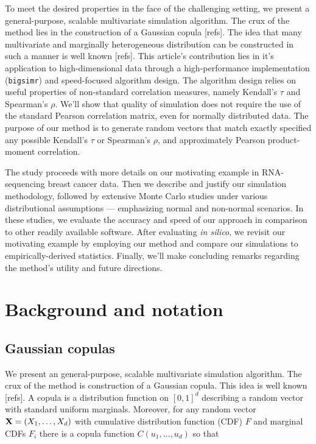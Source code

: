 \documentclass[
]{article}
\begin{document}
To meet the desired properties in the face of the challenging setting, we present a general-purpose, scalable multivariate simulation algorithm. The crux of the method lies in the construction of a Gaussian copula {[}refs{]}. The idea that many multivariate and marginally heterogeneous distribution can be constructed in such a manner is well known {[}refs{]}. This article's contribution lies in it's application to high-dimensional data through a high-performance implementation (\texttt{bigsimr}) and speed-focused algorithm design. The algorithm design relies on useful properties of non-standard correlation measures, namely Kendall's \(\tau\) and Spearman's \(\rho\). We'll show that quality of simulation does not require the use of the standard Pearson correlation matrix, even for normally distributed data. The purpose of our method is to generate random vectors that match exactly specified any possible Kendall's \(\tau\) or Spearman's \(\rho\), and approximately Pearson product-moment correlation.

The study proceeds with more details on our motivating example in RNA-sequencing breast cancer data. Then we describe and justify our simulation methodology, followed by extensive Monte Carlo studies under various distributional assumptions --- emphasizing normal and non-normal scenarios. In these studies, we evaluate the accuracy and speed of our approach in comparison to other readily available software. After evaluating \emph{in silico}, we revisit our motivating
example by employing our method and compare our simulations to empirically-derived statistics. Finally, we'll make concluding remarks regarding the method's utility and future directions.

\hypertarget{background-and-notation}{%
\section{Background and notation}\label{background-and-notation}}

\hypertarget{gaussian-copulas}{%
\subsection{Gaussian copulas}\label{gaussian-copulas}}

We present an general-purpose, scalable multivariate simulation algorithm. The crux of the method is construction of a Gaussian copula. This idea is well known {[}refs{]}. A copula is a distribution function on \([0,1]^d\) describing a random vector with standard uniform marginals. Moreover, for any random vector \({\bf X}=(X_1, \ldots, X_d)\) with cumulative distribution function (CDF) \(F\) and marginal CDFs \(F_i\) there is a copula function
\(C(u_1, \ldots, u_d)\) so that
\end{document}
